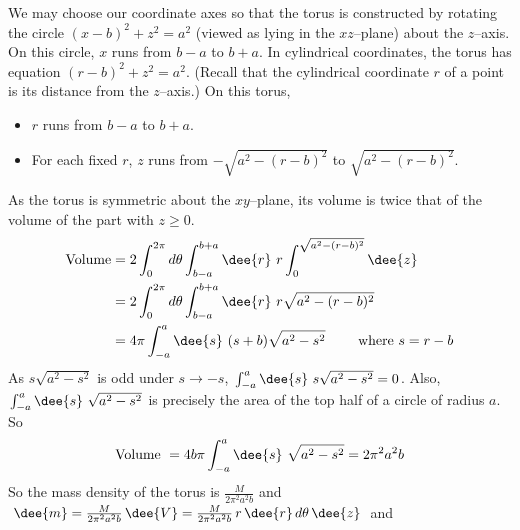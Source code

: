 \begin{solution}
 We may choose our coordinate axes so that the torus is constructed by rotating the circle $(x-b)^2+z^2=a^2$
(viewed as lying in the $xz$--plane) about the $z$--axis. On this circle,
$x$ runs from $b-a$ to $b+a$. 
%
In cylindrical coordinates, the torus has equation $(r-b)^2+z^2=a^2$. 
(Recall that the cylindrical coordinate $r$ of a point is its distance from the 
$z$--axis.)
On this torus, 
\begin{itemize}
\item $r$ runs from $b-a$ to $b+a$. 
\item For each fixed $r$, $z$ runs
from $-\sqrt{a^2-(r-b)^2}$ to $\sqrt{a^2-(r-b)^2}$. 
\end{itemize}
As the torus
is symmetric about the $xy$--plane, its volume is twice that of the volume 
of the part with $z\ge 0$. 
\begin{align*}
\text{Volume}
&= 2\int_{0}^{2\pi} d\theta\int_{b-a}^{b+a}\dee{r}\ r\int_{0}^{\sqrt{a^2-(r-b)^2}}\dee{z} \\
&= 2\int_{0}^{2\pi} d\theta\int_{b-a}^{b+a}\dee{r}\ r\sqrt{a^2-(r-b)^2} \\
&= 4\pi \int_{-a}^{a}\dee{s}\ (s+b)\sqrt{a^2-s^2}
\qquad\text{ where $s=r-b$}
\end{align*}
As $s\sqrt{a^2-s^2}$ is odd under $s\rightarrow -s$, 
$\int_{-a}^{a}\dee{s}\ s\sqrt{a^2-s^2}=0$. Also,  $\int_{-a}^{a}\dee{s}\ \sqrt{a^2-s^2}$
is precisely the area of the top half of a circle of radius $a$. So
$$
\text{Volume }= 4b\pi \int_{-a}^{a}\dee{s}\ \sqrt{a^2-s^2}
=2\pi^2a^2b
$$
So the mass density of the torus is $\frac{M}{2\pi^2a^2b}$ and
$\dee{m} = \frac{M}{2\pi^2a^2b}\,\dee{V}
          =\frac{M}{2\pi^2a^2b}\,r\,\dee{r}\,d\theta\,\dee{z}$ 
and
\begin{align*}

\end{align*}
\end{solution}
